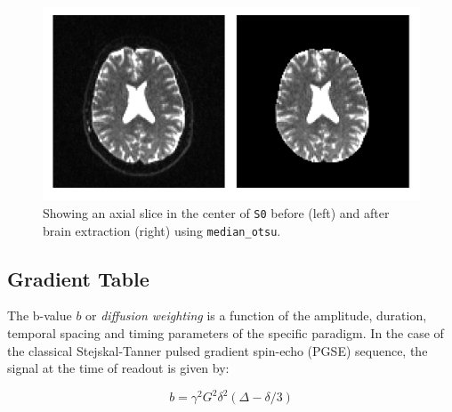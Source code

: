 \documentclass{bioinfo}
\begin{document}
\begin{figure}
\includegraphics[scale=0.65]{Figures/median_otsu.jpg}
\centering{}
\caption{Showing an axial slice in the center of \texttt{S0} before (left) and after brain extraction (right) using \texttt{median\_otsu}. \label{Fig:brain_segmentation}}
\end{figure}

\subsection{Gradient Table}\label{gtab}
The b-value $b$ or \emph{diffusion weighting} is a function of the amplitude,
duration, temporal spacing and timing parameters of the specific paradigm. In
the case of the classical Stejskal-Tanner pulsed gradient spin-echo (PGSE)
sequence, the signal at the time of readout is given by:

\begin{equation}
b=\gamma^{2}G^{2}\delta^{2}\left(\Delta-\delta/3 \right)\label{eq:stejskal}
\end{equation}
\end{document}
